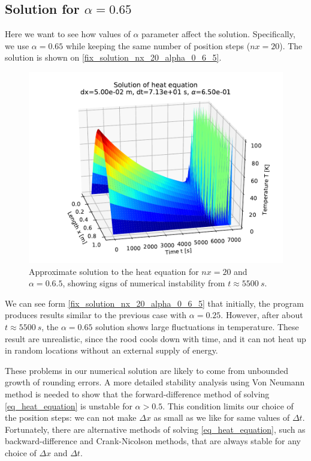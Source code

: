 \subsection{Solution for $\alpha=0.65$}

Here we want to see how values of $\alpha$ parameter affect the solution. Specifically, we use $\alpha = 0.65$ while keeping the same number of position steps ($nx=20$). The solution is shown on \autoref{fix_solution_nx_20_alpha_0_6_5}.
\begin{figure}[H]
  \centering
  \includegraphics[width=1.0\textwidth]{figures/solution_6_50e_01.pdf}
  \caption{Approximate solution to the heat equation for $nx=20$ and $\alpha = 0.6.5$, showing signs of numerical instability from $t \approx 5500 \ s$.}
  \label{fix_solution_nx_20_alpha_0_6_5}
\end{figure}
We can see form \autoref{fix_solution_nx_20_alpha_0_6_5} that initially, the program produces results similar to the previous case with $\alpha=0.25$. However, after about $t \approx 5500 \ s$, the $\alpha=0.65$ solution shows large fluctuations in temperature. These result are unrealistic, since the rood cools down with time, and it can not heat up in random locations without an external supply of energy.

These problems in our numerical solution are likely to come from unbounded growth of rounding errors. A more detailed stability analysis using Von Neumann method is needed to show that the forward-difference method of solving \autoref{eq_heat_equation} is unstable for $\alpha > 0.5$. This condition limits our choice of the position steps: we can not make $\Delta x$ as small as we like for same values of $\Delta t$. Fortunately, there are alternative methods of solving \autoref{eq_heat_equation}, such as backward-difference and Crank-Nicolson methods, that are always stable for any choice of $\Delta x$ and $\Delta t$.



